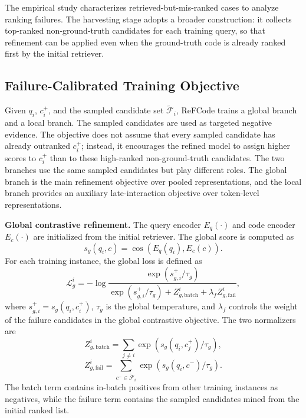 \documentclass[10pt,conference]{IEEEtran}
\newcommand{\method}{ReFCode}
\begin{document}
The empirical study characterizes retrieved-but-mis-ranked cases to analyze ranking failures. The harvesting stage adopts a broader construction: it collects top-ranked non-ground-truth candidates for each training query, so that refinement can be applied even when the ground-truth code is already ranked first by the initial retriever.

\subsection{Failure-Calibrated Training Objective}
\label{sec:failure_calibrated_training}

Given \(q_i\), \(c_i^+\), and the sampled candidate set \(\widetilde{\mathcal{F}}_i\), \method{} trains a global branch and a local branch. The sampled candidates are used as targeted negative evidence. The objective does not assume that every sampled candidate has already outranked \(c_i^+\); instead, it encourages the refined model to assign higher scores to \(c_i^+\) than to these high-ranked non-ground-truth candidates. The two branches use the same sampled candidates but play different roles. The global branch is the main refinement objective over pooled representations, and the local branch provides an auxiliary late-interaction objective over token-level representations.

\textbf{Global contrastive refinement.}
The query encoder \(E_q(\cdot)\) and code encoder \(E_c(\cdot)\) are initialized from the initial retriever. The global score is computed as
\begin{equation}
    s_g(q_i,c)=\cos(E_q(q_i),E_c(c)).
\end{equation}
For each training instance, the global loss is defined as
\begin{equation}
\mathcal{L}_{g}^{i}
= -\log
\frac{\exp(s_{g,i}^{+}/\tau_g)}
{\exp(s_{g,i}^{+}/\tau_g)+Z_{g,\mathrm{batch}}^{i}
+\lambda_f Z_{g,\mathrm{fail}}^{i}},
\end{equation}
where \(s_{g,i}^{+}=s_g(q_i,c_i^+)\), \(\tau_g\) is the global temperature, and \(\lambda_f\) controls the weight of the failure candidates in the global contrastive objective. The two normalizers are
\begin{equation}
Z_{g,\mathrm{batch}}^{i}
=
\sum_{j\neq i}\exp(s_g(q_i,c_j^+)/\tau_g),
\end{equation}
\begin{equation}
Z_{g,\mathrm{fail}}^{i}
=
\sum_{c^-\in\widetilde{\mathcal{F}}_i}
\exp(s_g(q_i,c^-)/\tau_g).
\end{equation}
The batch term contains in-batch positives from other training instances as negatives, while the failure term contains the sampled candidates mined from the initial ranked list.
\end{document}
